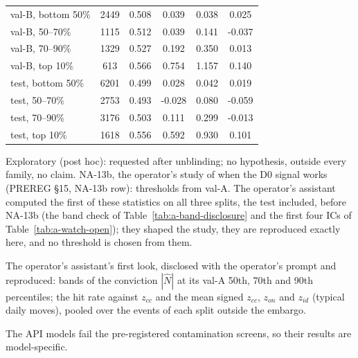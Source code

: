 \begin{table}[htbp]
\begin{threeparttable}
\begin{tabular}{@{}lS[table-format=4.0]S[table-format=1.3]S[table-format=-1.3]S[table-format=-1.3]S[table-format=-1.3]@{}}
val-B, bottom 50\% & 2449 & 0.508 & 0.039 & 0.038 & 0.025 \\
val-B, 50--70\% & 1115 & 0.512 & 0.039 & 0.141 & -0.037 \\
val-B, 70--90\% & 1329 & 0.527 & 0.192 & 0.350 & 0.013 \\
val-B, top 10\% & 613 & 0.566 & 0.754 & 1.157 & 0.140 \\
test, bottom 50\% & 6201 & 0.499 & 0.028 & 0.042 & 0.019 \\
test, 50--70\% & 2753 & 0.493 & -0.028 & 0.080 & -0.059 \\
test, 70--90\% & 3176 & 0.503 & 0.111 & 0.299 & -0.013 \\
test, top 10\% & 1618 & 0.556 & 0.592 & 0.930 & 0.101 \\
\bottomrule
\end{tabular}
\begin{tablenotes}[flushleft]\footnotesize
\item Exploratory (post hoc): requested after unblinding; no hypothesis, outside every family, no claim. NA-13b, the operator's study of when the D0 signal works (PREREG \S15, NA-13b row): thresholds from val-A. The operator's assistant computed the first of these statistics on all three splits, the test included, before NA-13b (the band check of Table~\ref{tab:a-band-disclosure} and the first four ICs of Table~\ref{tab:a-watch-open}); they shaped the study, they are reproduced exactly here, and no threshold is chosen from them.
\item The operator's assistant's first look, disclosed with the operator's prompt and reproduced: bands of the conviction $|\hat N|$ at its val-A 50th, 70th and 90th percentiles; the hit rate against $z_{cc}$ and the mean signed $z_{cc}$, $z_{on}$ and $z_{id}$ (typical daily moves), pooled over the events of each split outside the embargo.
\item The API models fail the pre-registered contamination screens, so their results are model-specific.
\end{tablenotes}
\end{threeparttable}
\end{table}
